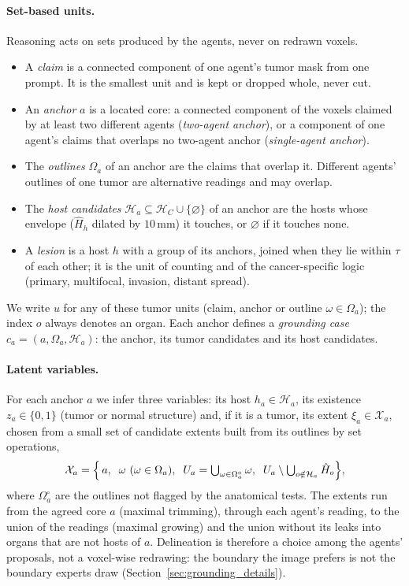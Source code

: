 \documentclass[fleqn,10pt]{olplainarticle}
\begin{document}
\paragraph{Set-based units.}
Reasoning acts on sets produced by the agents, never on redrawn voxels.
\begin{itemize}
\item A \emph{claim} is a connected component of one agent's tumor mask from one prompt. It is the smallest unit and is
kept or dropped whole, never cut.
\item An \emph{anchor} $a$ is a located core: a connected component of the voxels claimed by at least two different
agents (\emph{two-agent anchor}), or a component of one agent's claims that overlaps no two-agent anchor
(\emph{single-agent anchor}).
\item The \emph{outlines} $\Omega_a$ of an anchor are the claims that overlap it. Different agents' outlines of one
tumor are alternative readings and may overlap.
\item The \emph{host candidates} $\mathcal{H}_a\subseteq\mathcal{H}_C\cup\{\varnothing\}$ of an anchor are the hosts whose
envelope ($\hat H_h$ dilated by $10$\,mm) it touches, or $\varnothing$ if it touches none.
\item A \emph{lesion} is a host $h$ with a group of its anchors, joined when they lie within $\tau$ of each other; it is the
unit of counting and of the cancer-specific logic (primary, multifocal, invasion, distant spread).
\end{itemize}
We write $u$ for any of these tumor units (claim, anchor or outline $\omega\in\Omega_a$); the index $o$ always denotes an
organ. Each anchor defines a \emph{grounding case} $c_a=(a,\Omega_a,\mathcal{H}_a)$: the anchor, its tumor candidates and
its host candidates.

\paragraph{Latent variables.}
For each anchor $a$ we infer three variables: its host $h_a\in\mathcal{H}_a$, its existence $z_a\in\{0,1\}$ (tumor or
normal structure) and, if it is a tumor, its extent $\xi_a\in\mathcal{X}_a$, chosen from a small set of candidate extents
built from its outlines by set operations,
\begin{equation}
\label{eq:extents}
\mathcal{X}_a=\Bigl\{\,a,\;\;\omega\ (\omega\in\Omega_a),\;\;U_a=\textstyle\bigcup_{\omega\in\Omega^{\circ}_a}\omega,\;\;
U_a\setminus\bigcup_{o\notin\mathcal{H}_a}\hat H_{o}\Bigr\},
\end{equation}
where $\Omega^{\circ}_a$ are the outlines not flagged by the anatomical tests. The extents run from the agreed core
$a$ (maximal trimming), through each agent's reading, to the union of the readings (maximal growing) and the union
without its leaks into organs that are not hosts of $a$. Delineation is therefore a choice among the agents' proposals,
not a voxel-wise redrawing: the boundary the image prefers is not the boundary experts draw
(Section~\ref{sec:grounding_details}).
\end{document}
